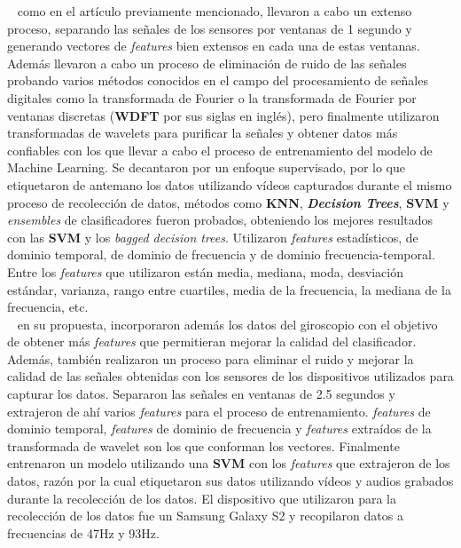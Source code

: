 ~\cite{el2018towards} como en el artículo previamente mencionado, llevaron a cabo un extenso proceso, separando las señales de los sensores por
ventanas de 1 segundo y generando vectores de \emph{features} bien extensos en cada una de estas ventanas. Además llevaron a cabo un proceso de eliminación de ruido
de las señales probando varios métodos conocidos en el campo del procesamiento de señales digitales como la transformada de Fourier o la transformada de
Fourier por ventanas discretas (\textbf{WDFT} por sus siglas en inglés), pero finalmente utilizaron transformadas de wavelets para purificar la señales y obtener
datos más confiables con los que llevar a cabo el proceso de entrenamiento del modelo de Machine Learning. Se decantaron por un enfoque supervisado, por lo que 
etiquetaron de antemano los datos utilizando vídeos capturados durante el mismo proceso de recolección de datos, métodos como \textbf{KNN},
\emph{\textbf{Decision Trees}}, \textbf{SVM} y \emph{ensembles} de clasificadores fueron probados, obteniendo los mejores resultados con las \textbf{SVM} y los
\emph{bagged decision trees}. Utilizaron \emph{features} estadísticos, de dominio temporal, de dominio de frecuencia y de dominio frecuencia-temporal. Entre los
\emph{features} que utilizaron están media, mediana, moda, desviación estándar, varianza, rango entre cuartiles, media de la frecuencia, la mediana de la frecuencia,
etc.\\

~\cite{seraj2015roads} en su propuesta, incorporaron además los datos del giroscopio con el objetivo de obtener más \emph{features} que permitieran mejorar la calidad
del clasificador. Además, también realizaron un proceso para eliminar el ruido y mejorar la calidad de las señales obtenidas con los sensores de los dispositivos
utilizados para capturar los datos. Separaron las señales en ventanas de 2.5 segundos y extrajeron de ahí varios \emph{features} para el proceso de entrenamiento.
\emph{features} de dominio temporal, \emph{features} de dominio de frecuencia y \emph{features} extraídos de la transformada de wavelet son los que conforman los vectores.
Finalmente entrenaron un modelo utilizando una \textbf{SVM} con los \emph{features} que extrajeron de los datos, razón por la cual etiquetaron sus datos utilizando vídeos
y audios grabados durante la recolección de los datos. El dispositivo que utilizaron para la recolección de los datos fue un Samsung Galaxy S2 y recopilaron datos a
frecuencias de 47Hz y 93Hz.\\

